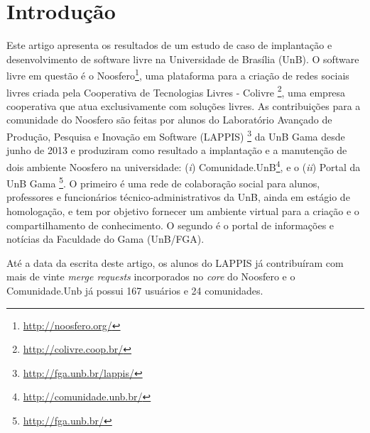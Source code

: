 \section{Introdução}
\label{sec:intro}

Este artigo apresenta os resultados de um estudo de caso de implantação e
desenvolvimento de software livre na Universidade de Brasília (UnB). O
software livre em questão é o Noosfero\footnote{\url{http://noosfero.org/}},
uma plataforma para a criação de redes sociais livres criada pela
Cooperativa de Tecnologias Livres - Colivre%
\footnote{\url{http://colivre.coop.br/}}, uma empresa cooperativa que atua
exclusivamente com soluções livres. As contribuições para a comunidade do
Noosfero são feitas por alunos do Laboratório Avançado de Produção,
Pesquisa e Inovação em Software (LAPPIS)%
\footnote{\url{http://fga.unb.br/lappis/}} da UnB Gama desde junho de 2013
e produziram como resultado a implantação e a manutenção de dois ambiente
Noosfero na universidade: (\textit{i}) Comunidade.UnB\footnote{%
\url{http://comunidade.unb.br/}}, e o (\textit{ii}) Portal da UnB Gama%
\footnote{\url{http://fga.unb.br/}}. O primeiro é uma rede de colaboração
social para alunos, professores e funcionários técnico-administrativos da
UnB, ainda em estágio de homologação, e tem por objetivo fornecer um ambiente
virtual para a criação e o compartilhamento de conhecimento. O segundo é o
portal de informações e notícias da Faculdade do Gama (UnB/FGA).

Até a data da escrita deste artigo, os alunos do LAPPIS já contribuíram com
mais de vinte \textit{merge requests} incorporados no \textit{core} do
Noosfero e o Comunidade.Unb já possui 167 usuários e 24 comunidades.
